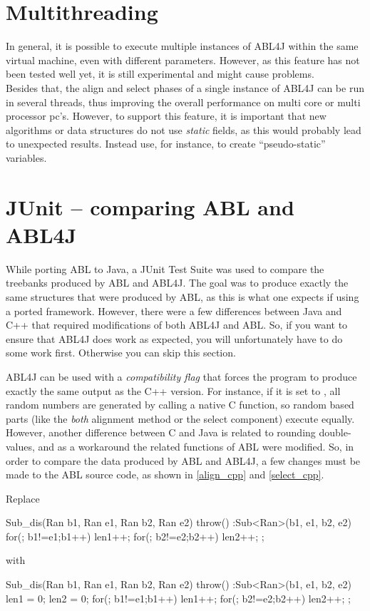 \documentclass[12pt,a4paper]{article}
\newcommand{\code}[1]{{\ttfamily\selectfont{#1}}}
\begin{document}
\section{Multithreading}\label{multithreading}
In general, it is possible to execute multiple instances of ABL4J within the
same virtual machine, even with different parameters. However, as this feature
has not been tested well yet, it is still experimental and might cause problems.
\\
Besides that, the align and select phases of a single instance of ABL4J can be
run in several threads, thus improving the overall performance on multi core
or multi processor pc's. However, to support this feature, it is important that
new algorithms or data structures do not use \emph{static} fields, as this
would probably lead to unexpected results. Instead use, for instance,
\code{java.lang.InheritableThreadLocal} to create "`pseudo-static"' variables.



\section{JUnit -- comparing ABL and ABL4J}
\label{junit}
While porting ABL to Java, a JUnit Test Suite was used to compare the treebanks
produced by ABL and ABL4J. The goal was to produce exactly the same structures
that were produced by ABL, as this is what one expects if using a ported
framework. However, there were a few differences between Java and C++ that
required modifications of both ABL4J and ABL. So, if you want to ensure that
ABL4J does work as expected, you will unfortunately have to do some work first.
Otherwise you can skip this section.

ABL4J can be used with a \emph{compatibility flag} that forces the program to
produce exactly the same output as the C++ version. For instance, if it is set
to \code{true}, all random numbers are generated by calling a native C
function, so random based parts (like the \emph{both} alignment method or
the select component) execute equally. However, another difference between C
and Java is related to rounding double-values, and as a workaround the related 
functions of ABL were modified. So, in order to compare the data produced by ABL
and ABL4J, a few changes must be made to the ABL source code, as shown in
\ref{align_cpp} and \ref{select_cpp}.

\begin{cpp} [caption={Required Changes in Align.cpp},
label={align_cpp}] 

Replace

Sub_dis(Ran b1, Ran e1, Ran b2, Ran e2) throw() 
     :Sub<Ran>(b1, e1, b2, e2) {
      for(; b1!=e1;b1++) { len1++; }
      for(; b2!=e2;b2++) { len2++; }
   };

with

Sub_dis(Ran b1, Ran e1, Ran b2, Ran e2) throw() 
     :Sub<Ran>(b1, e1, b2, e2) {
	len1 = 0; len2 = 0;
      for(; b1!=e1;b1++) { len1++; }
      for(; b2!=e2;b2++) { len2++; }
   };
\end{cpp}
\end{document}
